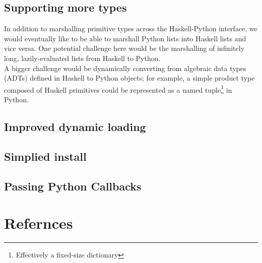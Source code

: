 \documentclass[11pt, letterpaper, oneside, twocolumn] {article}
\begin{document}
\subsection{Supporting more types}
In addition to marshalling primitive types across the Haskell-Python interface, we would eventually like to be able to marshall Python lists into Haskell lists and vice versa. One potential challenge here would be the marshalling of infinitely long, lazily-evaluated lists from Haskell to Python. \\
A bigger challenge would be dynamically converting from algebraic data types (ADTs) defined in Haskell to Python objects; for example, a simple product type composed of Haskell primitives could be represented as a named tuple\footnote{Effectively a fixed-size dictionary} in Python.

\subsection{Improved dynamic loading}


\subsection{Simplied install}


\subsection{Passing Python Callbacks}

\section{Refernces}

\end{document}
